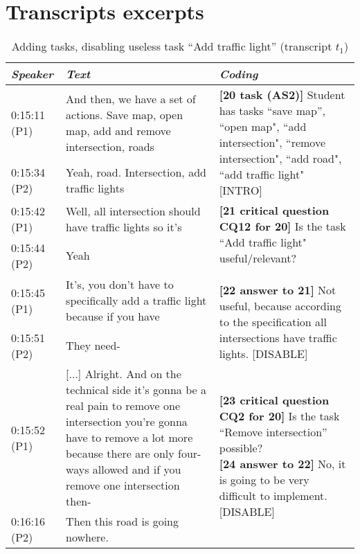 \section{Transcripts excerpts}
\label{sect:transcripts:excerpts}

\begin{table}[!htbp]
\centering
\begin{tabular}{|p{17mm}|p{63mm}|p{70mm}|}
\hline
\textit{Speaker} & \textit{Text} & \textit{Coding}\\
\hline
0:15:11 (P1) & And then, we have a set of actions. Save map, open map, add and remove intersection, roads & \multirow{2}{70mm}{\textbf{[20 task (AS2)]} Student has tasks ``save map'', ``open map", ``add intersection", ``remove intersection", ``add road", ``add traffic light" \textsf{[INTRO]}}\\
\cline{1-2}
0:15:34 (P2) & Yeah, road. Intersection, add traffic lights &\\
\hline
0:15:42 (P1) & Well, all intersection should have traffic lights so it's & \multirow{4}{70mm}{\textbf{[21 critical question CQ12 for 20]} Is the task ``Add traffic light" useful/relevant?\newline\newline
\textbf{[22 answer to 21]} Not useful, because according to the specification all intersections have traffic lights. \textsf{[DISABLE]}}\\
\cline{1-2}
0:15:44 (P2) & Yeah &\\
\cline{1-2}
0:15:45 (P1) & It's, you don't have to specifically add a traffic light because if you have &\\
\cline{1-2}
0:15:51 (P2)	& They need-&\\
\hline
0:15:52 (P1) & [...] Alright. And on the technical side it’s gonna be a real pain to remove one intersection you’re gonna have to remove a lot more because there are only four-ways allowed and if you remove one intersection then- & \multirow{2}{70mm}{\textbf{[23 critical question CQ2 for 20]} Is the task ``Remove intersection'' possible? \newline \textbf{[24 answer to 22]} No, it is going to be very difficult to implement. \textsf{[DISABLE]} }\\
\cline{1-2}
0:16:16 (P2) & Then this road is going nowhere. & \\
\hline
\end{tabular}
\caption{Adding tasks, disabling useless task ``Add traffic light'' (transcript $t_1$)}
\label{table:transcripts:traffic-light}


\end{table}
